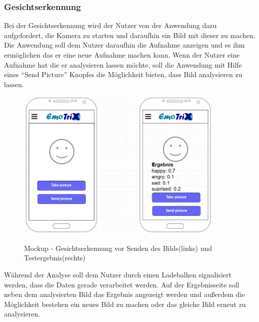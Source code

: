 \subsubsection{Gesichtserkennung}
\label{section:Mockup-Gesichtserkennung}
Bei der Gesichtserkennung wird der Nutzer von der Anwendung dazu aufgefordert, die Kamera zu starten und daraufhin ein Bild mit dieser zu machen. Die Anwendung soll dem Nutzer daraufhin die Aufnahme anzeigen und es ihm ermöglichen das er eine neue Aufnahme machen kann. Wenn der Nutzer eine Aufnahme hat die er analysieren lassen möchte, soll die Anwendung mit Hilfe eines ``Send Picture'' Knopfes die Möglichkeit bieten, dass Bild analysieren zu lassen. \newline
\begin{figure}[h]
	\centering
	\includegraphics[width=10cm]{Bilder/Mockup-Gesichtserkennung.png}
	\label{img:Mockup-Gesichtserkennung}
	\caption[Mockup - Gesichtserkennung vor Senden des Bilds(links) und Testergebnis(rechts)]{Mockup - Gesichtserkennung vor Senden des Bilds(links) und Testergebnis(rechts)}
\end{figure} \newline
Während der Analyse soll dem Nutzer durch einen Ladebalken signalisiert werden, dass die Daten gerade verarbeitet werden. Auf der Ergebnisseite soll neben dem analysierten Bild das Ergebnis angezeigt werden und außerdem die Möglichkeit bestehen ein neues Bild zu machen oder das gleiche Bild erneut zu analysieren.

